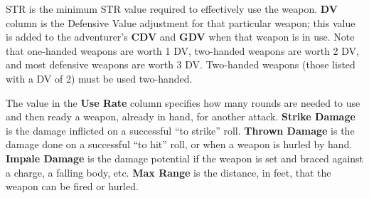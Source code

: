 STR is the minimum STR value required to effectively use the weapon. \textbf{DV} column is the Defensive Value adjustment for that particular weapon; this value is added to the adventurer’s \textbf{CDV} and \textbf{GDV} when that weapon is in use. Note that one-handed weapons are worth 1 DV, two-handed weapons are worth 2 DV, and most defensive weapons are worth 3 DV. Two-handed weapons (those listed with a DV of 2) must be used two-handed.

The value in the \textbf{Use Rate} column specifies how many rounds are needed to use and then ready a weapon, already in hand, for another attack. \textbf{Strike Damage} is the damage inflicted on a successful “to strike” roll. \textbf{Thrown Damage} is the damage done on a successful “to hit” roll, or when a weapon is hurled by hand. \textbf{Impale Damage} is the damage potential if the weapon is set and braced against a charge, a falling body, etc. \textbf{Max Range} is the distance, in feet, that the weapon can be fired or hurled.
\label{playing-weapon-table}
